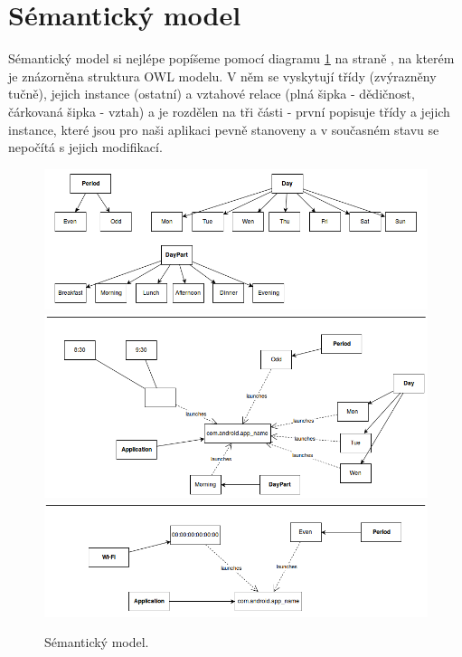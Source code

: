 \documentclass[thesis=M,czech]{FITthesis}[2012/06/26]
\begin{document}
\section{Sémantický model}\label{sec:semantic_model}
Sémantický model si nejlépe popíšeme pomocí diagramu \ref{fig:semantic} na straně \pageref{fig:semantic}, na kterém je znázorněna struktura OWL modelu. V něm se vyskytují třídy (zvýrazněny tučně), jejich instance (ostatní) a vztahové relace (plná šipka - dědičnost, čárkovaná šipka - vztah) a je rozdělen na tři části - první popisuje třídy a jejich instance, které jsou pro naši aplikaci pevně stanoveny a v současném stavu se nepočítá s jejich modifikací.

\begin{figure}\centering
	\includegraphics[width=1\textwidth]{figures/semantic1}
	\includegraphics[width=1\textwidth]{figures/semantic2}
	\includegraphics[width=1\textwidth]{figures/semantic3}
	\caption{Sémantický model.}
	\label{fig:semantic}
\end{figure}
\end{document}
